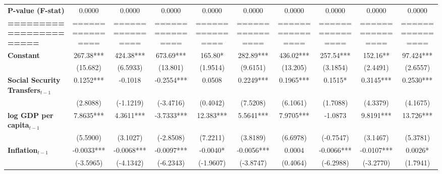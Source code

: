 \begin{center}
\begin{tabular}{lccccccccc}
\textbf{P-value (F-stat)}          &       0.0000       &       0.0000       &       0.0000       &       0.0000       &       0.0000       &       0.0000       &       0.0000       &       0.0000       &       0.0000        \\
\textbf{=======================}   &  ================  &  ================  &  ================  &  ================  &  ================  &  ================  &  ================  &  ================  &  ================   \\
\textbf{Constant}                     &     267.38***      &     424.38***      &     673.69***      &      165.80*       &     282.89***      &     436.02***      &     257.54***      &      152.16**      &     97.424***       \\
\textbf{ }                         &      (15.682)      &      (6.5933)      &      (13.801)      &      (1.9514)      &      (9.6151)      &      (13.205)      &      (3.1854)      &      (2.4491)      &      (2.6557)       \\
\textbf{Social Security Transfers$_{t-1}$}              &     0.1252***      &      -0.1018       &     -0.2554***     &       0.0508       &     0.2249***      &     0.1965***      &      0.1515*       &     0.3145***      &     0.2530***       \\
\textbf{ }                         &      (2.8088)      &     (-1.1219)      &     (-3.4716)      &      (0.4042)      &      (7.5208)      &      (6.1061)      &      (1.7088)      &      (4.3379)      &      (4.1675)       \\
\textbf{log GDP per capita$_{t-1}$}           &     7.8635***      &     4.3611***      &     -3.7333***     &     12.383***      &     5.5641***      &     7.9705***      &      -1.0873       &     9.8191***      &     13.726***       \\
\textbf{ }                         &      (5.5900)      &      (3.1027)      &     (-2.8508)      &      (7.2211)      &      (3.8189)      &      (6.6978)      &     (-0.7547)      &      (3.1467)      &      (5.3781)       \\
\textbf{Inflation$_{t-1}$}      &     -0.0033***     &     -0.0068***     &     -0.0097***     &      -0.0040*      &     -0.0056***     &       0.0004       &     -0.0066***     &     -0.0107***     &      0.0026*        \\
\textbf{ }                         &     (-3.5965)      &     (-4.1342)      &     (-6.2343)      &     (-1.9607)      &     (-3.8747)      &      (0.4064)      &     (-6.2988)      &     (-3.2770)      &      (1.7941)       \\

\end{tabular}
\end{center}
